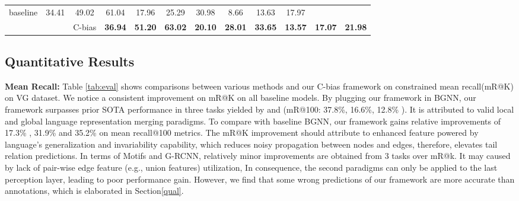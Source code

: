 \documentclass[runningheads]{llncs}
\begin{document}
\begin{table}[!t]
{\begin{tabular}{lccccccccccc}
      baseline                                    & 34.41                                      & 49.02
                                                  & 61.04                                      & 17.96                  & 25.29          &
      30.98                                       & 8.66                                       & 13.63                  & 17.97
      \\
                                                  &                                            &
      C-bias                                      & \textbf{36.94}                             & \textbf{51.20}
                                                  & \textbf{63.02}                             & \textbf{20.10}         & \textbf{28.01} &
      \textbf{33.65}                              & \textbf{13.57}                             & \textbf{17.07}         &
      \textbf{21.98}                                                                                                                       \\
      \hline
    \end{tabular}
  }
\end{table}
\subsection{Quantitative Results}\label{Quantitative}
\noindent\textbf{Mean Recall:}	Table \ref{tab:eval} shows comparisons between
various methods and our C-bias framework on constrained mean recall(mR@K) on VG
dataset. We notice a consistent improvement on mR@K on all baseline models.  By
plugging our framework in BGNN, our framework surpasses prior SOTA performance
in three tasks yielded by \cite{pcpl} and\cite{bgnn} (mR@100: 37.8\%, 16.6\%,
12.8\% ). It is attributed to valid local and global language representation
merging paradigms. To compare with baseline BGNN\cite{bgnn}, our framework
gains relative improvements of 17.3\% , 31.9\%	and 35.2\% on mean recall@100
metrics.  The mR@K improvement should attribute to enhanced feature powered by
language's generalization and invariability capability, which reduces noisy
propagation between nodes and edges, therefore, elevates tail relation
predictions.
In terms of Motifs and G-RCNN,	relatively minor improvements are obtained from
3 tasks over mR@k. It may caused by lack of pair-wise edge feature (e.g., union
features) utilization,	In consequence, the second paradigms can only be
applied to the last perception layer, leading to poor performance gain.
However, we find that some wrong predictions of our framework are more accurate
than annotations, which is elaborated in Section\ref{qual}.\\
\end{document}
